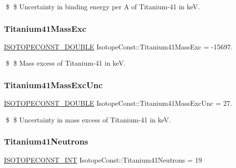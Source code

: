 \$ \$ Uncertainty in binding energy per A of Titanium-\/41 in keV. \mbox{\label{group___isotope_const-_titanium-_ti41_gaa92c6821a25cc351f32e5e8dc4d495bf}} 
\subsubsection{\texorpdfstring{Titanium41\+Mass\+Exc}{Titanium41MassExc}}
{\footnotesize\ttfamily \mbox{\hyperlink{group___isotope_const-_macros_ga8f45a7272ce02c0b4c65c44636ed719a}{I\+S\+O\+T\+O\+P\+E\+C\+O\+N\+S\+T\+\_\+\+D\+O\+U\+B\+LE}} Isotope\+Const\+::\+Titanium41\+Mass\+Exc = -\/15697.}

\$ \$ Mass excess of Titanium-\/41 in keV. \mbox{\label{group___isotope_const-_titanium-_ti41_gaeaa4681b87bdb19654b27ef4d8522555}} 
\subsubsection{\texorpdfstring{Titanium41\+Mass\+Exc\+Unc}{Titanium41MassExcUnc}}
{\footnotesize\ttfamily \mbox{\hyperlink{group___isotope_const-_macros_ga8f45a7272ce02c0b4c65c44636ed719a}{I\+S\+O\+T\+O\+P\+E\+C\+O\+N\+S\+T\+\_\+\+D\+O\+U\+B\+LE}} Isotope\+Const\+::\+Titanium41\+Mass\+Exc\+Unc = 27.}

\$ \$ Uncertainty in mass excess of Titanium-\/41 in keV. \mbox{\label{group___isotope_const-_titanium-_ti41_ga921475f62dc0776ba0ac22cd45b6ae63}} 
\subsubsection{\texorpdfstring{Titanium41\+Neutrons}{Titanium41Neutrons}}
{\footnotesize\ttfamily \mbox{\hyperlink{group___isotope_const-_macros_ga5f18360b3e99483a35c32d789e62621c}{I\+S\+O\+T\+O\+P\+E\+C\+O\+N\+S\+T\+\_\+\+I\+NT}} Isotope\+Const\+::\+Titanium41\+Neutrons = 19}

